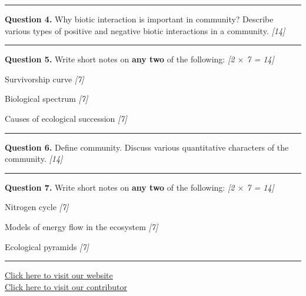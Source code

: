 \documentclass[11pt,a4paper]{article}
\newcommand{\pts}[1]{\hfill \textit{[#1]}}
\begin{document}
\medskip\rule{\linewidth}{0.2pt}\medskip

\noindent \textbf{Question 4.} Why biotic interaction is important in community? Describe various types of positive and negative biotic interactions in a community. \pts{14}

\medskip\rule{\linewidth}{0.2pt}\medskip

\noindent \textbf{Question 5.} Write short notes on \textbf{any two} of the following: \pts{2 $\times$ 7 = 14}
\begin{parts}
  \item Survivorship curve \pts{7}
  \item Biological spectrum \pts{7}
  \item Causes of ecological succession \pts{7}
\end{parts}

\medskip\rule{\linewidth}{0.2pt}\medskip

\noindent \textbf{Question 6.} Define community. Discuss various quantitative characters of the community. \pts{14}

\medskip\rule{\linewidth}{0.2pt}\medskip

\noindent \textbf{Question 7.} Write short notes on \textbf{any two} of the following: \pts{2 $\times$ 7 = 14}
\begin{parts}
  \item Nitrogen cycle \pts{7}
  \item Models of energy flow in the ecosystem \pts{7}
  \item Ecological pyramids \pts{7}
\end{parts}

\vfill
\rule{\linewidth}{0.4pt}

\begin{center}\small
\href{https://bhu-exam.vercel.app/}{Click here to visit our website}\\[4pt]
\href{https://me-aryan.vercel.app/}{Click here to visit our contributor}
\end{center}
\end{document}
